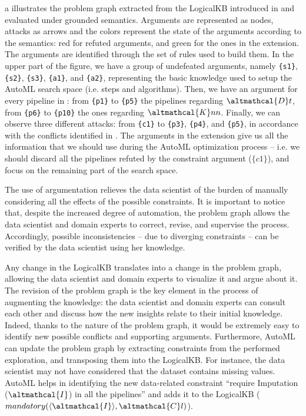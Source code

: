 \begin{example}
a illustrates the problem graph extracted from the LogicalKB introduced in  and evaluated under grounded semantics.
Arguments are represented as nodes, attacks as arrows and the colors represent the state of the arguments according to the semantics: red for refuted arguments, and green for the ones in the extension.
The arguments are identified through the set of rules used to build them.
In the upper part of the figure, we have a group of undefeated arguments, namely \texttt{\{s1\}}, \texttt{\{s2\}}, \texttt{\{s3\}}, \texttt{\{a1\}}, and \texttt{\{a2\}}, representing the basic knowledge used to setup the AutoML search space (i.e. steps and algorithms).
Then, we have an argument for every pipeline in : from \texttt{\{p1\}} to \texttt{\{p5\}} the pipelines regarding $\altmathcal{D}t$, from \texttt{\{p6\}} to \texttt{\{p10\}} the ones regarding $\altmathcal{K}nn$.
Finally, we can observe three different attacks: from \texttt{\{c1\}} to \texttt{\{p3\}}, \texttt{\{p4\}}, and \texttt{\{p5\}}, in accordance with the conflicts identified in .
The arguments in the extension give us all the information that we should use during the AutoML optimization process -- i.e. we should discard all the pipelines refuted by the constraint argument ($\{c1\}$), and focus on the remaining part of the search space.
\label{ex:graph}
\end{example}

The use of argumentation relieves the data scientist of the burden of manually considering all the effects of the possible constraints.
It is important to notice that, despite the increased degree of automation, the problem graph allows the data scientist and domain experts to correct, revise, and supervise the process.
Accordingly, possible inconsistencies -- due to diverging constraints -- can be verified by the data scientist using her knowledge.

Any change in the LogicalKB translates into a change in the problem graph, allowing the data scientist and domain experts to visualize it and argue about it.
The revision of the problem graph is the key element in the process of augmenting the knowledge: the data scientist and domain experts can consult each other and discuss how the new insights relate to their initial knowledge.
Indeed, thanks to the nature of the problem graph, it would be extremely easy to identify new possible conflicts and supporting arguments.
Furthermore, AutoML can update the problem graph by extracting constraints from the performed exploration, and transposing them into the LogicalKB.
For instance, the data scientist may not have considered that the dataset contains missing values.
AutoML helps in identifying the new data-related constraint ``require Imputation ($\altmathcal{I}$) in all the pipelines'' and adds it to the LogicalKB ($mandatory(\langle \altmathcal{I} \rangle, \altmathcal{C}l)$).

